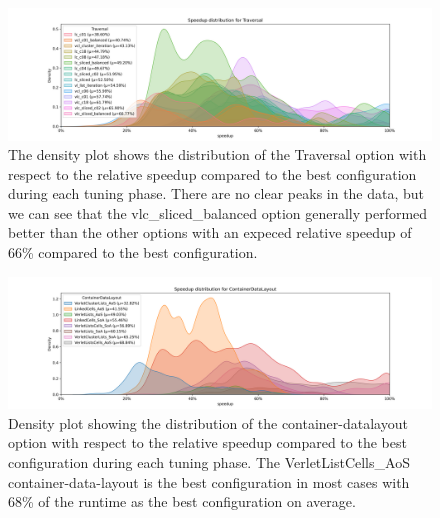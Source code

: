 \begin{figure}[H]
    \centering
    \includegraphics[width=\columnwidth,trim={1cm 0 2cm 1.5cm},clip]{figures/DataAnalytics/speedup_Traversal.png}
    \caption[Speedup density plot of Traversal option]{The density plot shows the distribution of the Traversal option with respect to the relative speedup compared to the best configuration during each tuning phase. There are no clear peaks in the data, but we can see that the vlc\_sliced\_balanced option generally performed better than the other options with an expeced relative speedup of 66\% compared to the best configuration.}
    \label{fig:inputAnalysisDensityTraversal}
\end{figure}

\begin{figure}[H]
    \centering
    \includegraphics[width=\columnwidth,trim={1cm 0 2cm 1.5cm},clip]{figures/DataAnalytics/speedup_ContainerDataLayout.png}
    \caption[Speedup density plot of Configuration-Datalayout option]{Density plot showing the distribution of the container-datalayout option with respect to the relative speedup compared to the best configuration during each tuning phase. The VerletListCells\_AoS container-data-layout is the best configuration in most cases with 68\% of the runtime as the best configuration on average.}
    \label{fig:inputAnalysisDensityDatalayout}
\end{figure}


